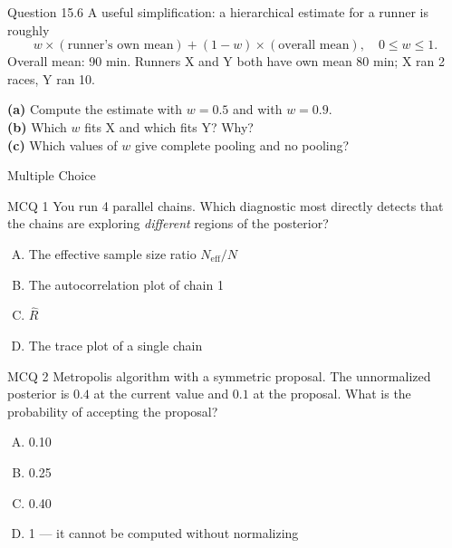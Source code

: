 \documentclass[aspectratio=43,11pt]{beamer}
\newcommand{\divider}[2]{%
  \begin{frame}
    \centering
    {\Large #1}\\[0.6em]
    {\normalsize #2}
  \end{frame}}
\begin{document}
\begin{frame}{Question 15.6}
  A useful simplification: a hierarchical estimate for a runner is roughly
  \[
    w \times (\text{runner's own mean}) + (1 - w) \times (\text{overall mean}),
    \quad 0 \le w \le 1 .
  \]
  Overall mean: 90 min. Runners X and Y both have own mean 80 min;
  X ran 2 races, Y ran 10.
  \vspace{0.4em}

  \textbf{(a)} Compute the estimate with $w = 0.5$ and with $w = 0.9$.
  \\[0.3em]
  \textbf{(b)} Which $w$ fits X and which fits Y? Why? \\[0.3em]
  \textbf{(c)} Which values of $w$ give complete pooling and no pooling?
\end{frame}

\divider{Multiple Choice}{}

\begin{frame}{MCQ 1}
  You run 4 parallel chains. Which diagnostic most directly detects that
  the chains are exploring \emph{different} regions of the posterior?
  \vspace{0.6em}
  \begin{enumerate}[(A)]
    \item The effective sample size ratio $N_{\text{eff}}/N$
    \item The autocorrelation plot of chain 1
    \item $\hat R$
    \item The trace plot of a single chain
  \end{enumerate}
\end{frame}

\begin{frame}{MCQ 2}
  Metropolis algorithm with a symmetric proposal. The unnormalized
  posterior is $0.4$ at the current value and $0.1$ at the proposal.
  What is the probability of accepting the proposal?
  \vspace{0.6em}
  \begin{enumerate}[(A)]
    \item 0.10
    \item 0.25
    \item 0.40
    \item 1 --- it cannot be computed without normalizing
  \end{enumerate}
\end{frame}
\end{document}
